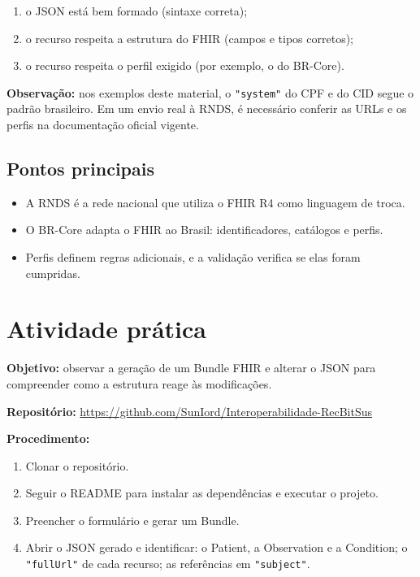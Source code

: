 \documentclass[11pt,a4paper]{article}
\newcommand{\codigo}[1]{\texttt{#1}}
\begin{document}
\begin{enumerate}
  \item o JSON está bem formado (sintaxe correta);
  \item o recurso respeita a estrutura do FHIR (campos e tipos corretos);
  \item o recurso respeita o perfil exigido (por exemplo, o do BR-Core).
\end{enumerate}

\textbf{Observação:} nos exemplos deste material, o \codigo{"system"} do
CPF e do CID segue o padrão brasileiro. Em um envio real à RNDS, é
necessário conferir as URLs e os perfis na documentação oficial vigente.

\subsection*{Pontos principais}

\begin{itemize}
  \item A RNDS é a rede nacional que utiliza o FHIR R4 como linguagem de
    troca.
  \item O BR-Core adapta o FHIR ao Brasil: identificadores, catálogos e
    perfis.
  \item Perfis definem regras adicionais, e a validação verifica se elas
    foram cumpridas.
\end{itemize}

\section{Atividade prática}

\textbf{Objetivo:} observar a geração de um Bundle FHIR e alterar o JSON
para compreender como a estrutura reage às modificações.

\textbf{Repositório:}
\url{https://github.com/SunIord/Interoperabilidade-RecBitSus}

\textbf{Procedimento:}

\begin{enumerate}
  \item Clonar o repositório.
  \item Seguir o README para instalar as dependências e executar o
    projeto.
  \item Preencher o formulário e gerar um Bundle.
  \item Abrir o JSON gerado e identificar: o Patient, a Observation e a
    Condition; o \codigo{"fullUrl"} de cada recurso; as referências em
    \codigo{"subject"}.
\end{enumerate}
\end{document}
